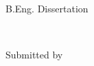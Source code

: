 
\begin{titlepage}

\begin{addmargin}[-1cm]{-3cm}

\begin{center}
\large

\hfill

\vfill

B.Eng. Dissertation \\ \bigskip \bigskip

\begingroup
\color{Maroon}\spacedallcaps{\myTitle} \\ \bigskip %
\endgroup

Submitted by \\
\spacedlowsmallcaps{\myName} %

\vfill




\vfill

\end{center}
\end{addmargin}

\end{titlepage}
